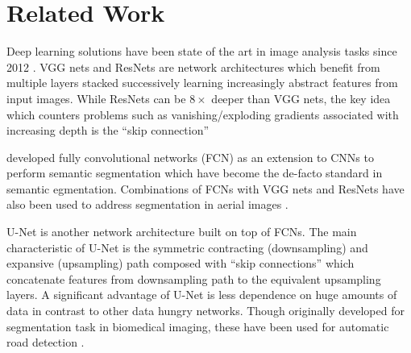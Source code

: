 \section{Related Work}
\label{sec:related}


Deep learning solutions have been state of the art in image analysis tasks
since 2012 \cite{Kri12}. VGG nets \cite{Zis14} and ResNets \cite{He15} are
network architectures which benefit from multiple layers stacked successively
learning increasingly abstract features from input images. While ResNets can be
$8\times$ deeper than VGG nets, the key idea which counters problems such as
vanishing/exploding gradients associated with increasing depth is the ``skip
connection''

\citeauthor{Lon14}\cite{Lon14} developed fully convolutional networks (FCN) as
an extension to CNNs to perform semantic segmentation which have become the
de-facto standard in semantic egmentation. Combinations of FCNs with VGG nets
and ResNets have also been used to address segmentation in aerial images
\cite{Mar16} \cite{kai17} \cite{Azi18}.

U-Net is another network architecture built on top of FCNs. The main
characteristic of U-Net is the symmetric contracting (downsampling) and
expansive (upsampling) path composed with ``skip connections'' which
concatenate features from downsampling path to the equivalent upsampling
layers. A significant advantage of U-Net is less dependence on huge amounts of
data in contrast to other data hungry networks.  Though originally developed
for segmentation task in biomedical imaging, these have been used for automatic
road detection \cite{Zha17} \cite{Guo18}.



